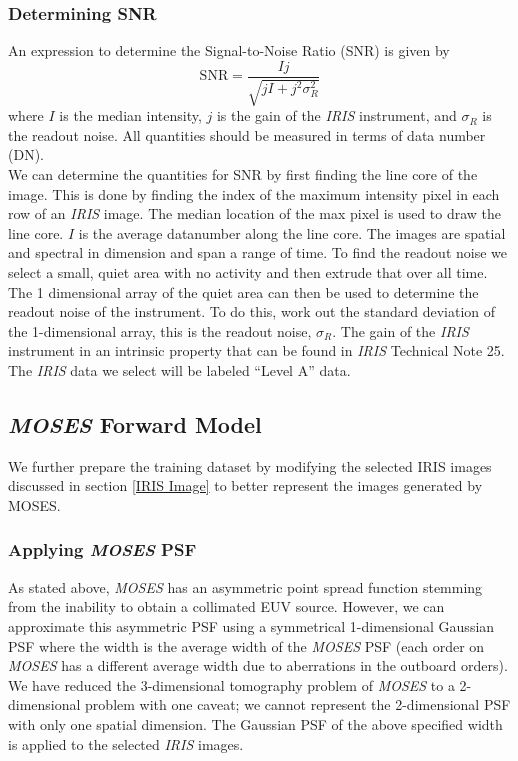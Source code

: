 \documentclass[10pt,a4paper,titlepage]{article}
\begin{document}
			\subsubsection{Determining SNR}
				An expression to determine the Signal-to-Noise Ratio (SNR) is given by 
				\begin{equation}
					\text{SNR} = \frac{I j}{ \sqrt{j I + j^2 \sigma_R^2}}
				\end{equation}
				where $I$ is the median intensity, $j$ is the gain of the \textit{IRIS} instrument, and $\sigma_R$ is the readout noise. All quantities should be measured in terms of data number (DN).\\
				We can determine the quantities for SNR by first finding the line core of the image. This is done by finding the index of the maximum intensity pixel in each row of an \textit{IRIS} image. The median location of the max pixel is used to draw the line core. $I$ is the average datanumber along the line core. The images are spatial and spectral in dimension and span a range of time. To find the readout noise we select a small, quiet area with no activity and then extrude that over all time. The 1 dimensional array of the quiet area can then be used to determine the readout noise of the instrument. To do this, work out the standard deviation of the 1-dimensional array, this is the readout noise, $\sigma_R$. The gain of the \textit{IRIS} instrument in an intrinsic property that can be found in \textit{IRIS} Technical Note 25.\\

				The \textit{IRIS} data we select will be labeled ``Level A'' data.
				
			\subsection{\textit{MOSES} Forward Model}
				We further prepare the training dataset by modifying the selected IRIS images discussed in section \ref{IRIS Image} to better represent the images generated by MOSES.
			
			\subsubsection{Applying \textit{MOSES} PSF}
				As stated above, \textit{MOSES} has an asymmetric point spread function stemming from the inability to obtain a collimated EUV source. However, we can approximate this asymmetric PSF using a symmetrical 1-dimensional Gaussian PSF where the width is the average width of the \textit{MOSES} PSF (each order on \textit{MOSES} has a different average width due to aberrations in the outboard orders). We have reduced the 3-dimensional tomography problem of \textit{MOSES} to a 2-dimensional problem with one caveat; we cannot represent the 2-dimensional PSF with only one spatial dimension. The Gaussian PSF of the above specified width is applied to the selected \textit{IRIS} images. \\
				
\end{document}
